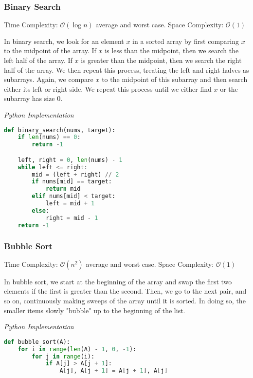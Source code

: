 \documentclass{article}
\newcommand{\bigO}{\ensuremath{\mathcal{O}}}
\begin{document}
    \subsubsection{Binary Search}
    Time Complexity: $\bigO(\log n)$ average and worst case.  Space Complexity: $\bigO(1)$
    
    In binary search, we look for an element $x$ in a sorted array by first comparing $x$ to the midpoint of the array. If $x$ is less than the midpoint, then we search the left half of the array. If $x$ is greater than the midpoint, then we search the right half of the array. We then repeat this process, treating the left and right halves as subarrays. Again, we compare $x$ to the midpoint of this subarray and then search either its left or right side. We repeat this process until we either find $x$ or the subarray has size 0.

\vspace{8pt} \emph{Python Implementation}
\begin{lstlisting}[language=Python]
def binary_search(nums, target):
    if len(nums) == 0:
        return -1

    left, right = 0, len(nums) - 1
    while left <= right:
        mid = (left + right) // 2
        if nums[mid] == target:
            return mid
        elif nums[mid] < target:
            left = mid + 1
        else:
            right = mid - 1
    return -1
\end{lstlisting}
    
    \subsubsection{Bubble Sort}
    Time Complexity: $\bigO(n^2)$ average and worst case. Space Complexity: $\bigO(1)$
     
    In bubble sort, we start at the beginning of the array and swap the first two elements if the first is greater than the second. Then, we go to the next pair, and so on, continuously making sweeps of the array until it is
    sorted. In doing so, the smaller items slowly "bubble" up to the beginning of the list. 

\vspace{8pt} \emph{Python Implementation}
\begin{lstlisting}[language=Python]
def bubble_sort(A):
    for i in range(len(A) - 1, 0, -1):
        for j in range(i):
            if A[j] > A[j + 1]:
                A[j], A[j + 1] = A[j + 1], A[j]
\end{lstlisting}
\end{document}
